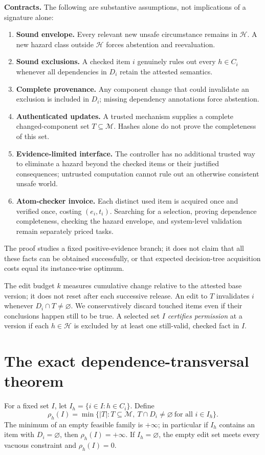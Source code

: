 \documentclass[11pt]{article}
\newcommand{\cm}{\mathcal M}\newcommand{\ch}{\mathcal H}\newcommand{\ci}{\mathcal I}
\begin{document}
\textbf{Contracts.} The following are substantive assumptions, not implications of a signature alone:
\begin{enumerate}[label=(A\arabic*),leftmargin=2.1em,itemsep=0.15em]
\item \textbf{Sound envelope.} Every relevant new unsafe circumstance remains in $\ch$. A new hazard class outside $\ch$ forces abstention and reevaluation.
\item \textbf{Sound exclusions.} A checked item $i$ genuinely rules out every $h\in C_i$ whenever all dependencies in $D_i$ retain the attested semantics.
\item \textbf{Complete provenance.} Any component change that could invalidate an exclusion is included in $D_i$; missing dependency annotations force abstention.
\item \textbf{Authenticated updates.} A trusted mechanism supplies a complete changed-component set $T\subseteq\cm$. Hashes alone do not prove the completeness of this set.
\item \textbf{Evidence-limited interface.} The controller has no additional trusted way to eliminate a hazard beyond the checked items or their justified consequences; untrusted computation cannot rule out an otherwise consistent unsafe world.
\item \textbf{Atom-checker invoice.} Each distinct used item is acquired once and verified once, costing $(e_i,t_i)$. Searching for a selection, proving dependence completeness, checking the hazard envelope, and system-level validation remain separately priced tasks.
\end{enumerate}
The proof studies a fixed positive-evidence branch; it does not claim that all these facts can be obtained successfully, or that expected decision-tree acquisition costs equal its instance-wise optimum.

The edit budget $k$ measures cumulative change relative to the attested base version; it does not reset after each successive release. An edit to $T$ invalidates $i$ whenever $D_i\cap T\ne\varnothing$. We conservatively discard touched items even if their conclusions happen still to be true. A selected set $I$ \emph{certifies permission} at a version if each $h\in\ch$ is excluded by at least one still-valid, checked fact in $I$.

\section{The exact dependence-transversal theorem}
For a fixed set $I$, let $I_h=\{i\in I:h\in C_i\}$. Define
\begin{equation}
\rho_h(I)=\min\bigl\{|T|:T\subseteq\cm,\ T\cap D_i\ne\varnothing\ \text{for all }i\in I_h\bigr\}.
\label{eq:transversal}
\end{equation}
The minimum of an empty feasible family is $+\infty$; in particular if $I_h$ contains an item with $D_i=\varnothing$, then $\rho_h(I)=+\infty$. If $I_h=\varnothing$, the empty edit set meets every vacuous constraint and $\rho_h(I)=0$.
\end{document}
